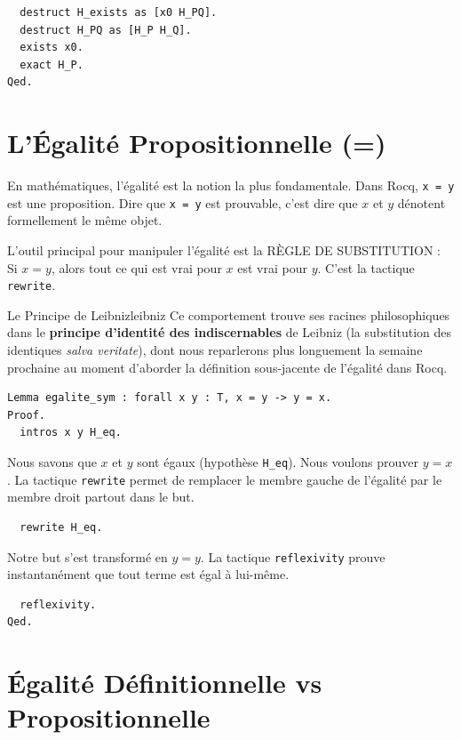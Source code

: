 \documentclass[11pt,a4paper]{article}
\begin{document}
\begin{lstlisting}
  destruct H_exists as [x0 H_PQ].
  destruct H_PQ as [H_P H_Q].
  exists x0.
  exact H_P.
Qed.
\end{lstlisting}

\section{L'Égalité Propositionnelle (=)}

En mathématiques, l'égalité est la notion la plus fondamentale. Dans Rocq, \texttt{x = y} est une proposition. Dire que \texttt{x = y} est prouvable, c'est dire que $x$ et $y$ dénotent formellement le même objet.

L'outil principal pour manipuler l'égalité est la RÈGLE DE SUBSTITUTION : Si $x = y$, alors tout ce qui est vrai pour $x$ est vrai pour $y$. C'est la tactique \texttt{rewrite}.

\begin{remarque}{Le Principe de Leibniz}{leibniz}
  Ce comportement trouve ses racines philosophiques dans le \textbf{principe d'identité des indiscernables} de Leibniz (la substitution des identiques \textit{salva veritate}), dont nous reparlerons plus longuement la semaine prochaine au moment d'aborder la définition sous-jacente de l'égalité dans Rocq.
\end{remarque}

\begin{lstlisting}
Lemma egalite_sym : forall x y : T, x = y -> y = x.
Proof.
  intros x y H_eq.
\end{lstlisting}

Nous savons que $x$ et $y$ sont égaux (hypothèse \texttt{H\_eq}). Nous voulons prouver $y = x$. La tactique \texttt{rewrite} permet de remplacer le membre gauche de l'égalité par le membre droit partout dans le but.

\begin{lstlisting}
  rewrite H_eq.
\end{lstlisting}

Notre but s'est transformé en $y = y$. La tactique \texttt{reflexivity} prouve instantanément que tout terme est égal à lui-même.

\begin{lstlisting}
  reflexivity.
Qed.
\end{lstlisting}

\section{Égalité Définitionnelle vs Propositionnelle}
\end{document}
